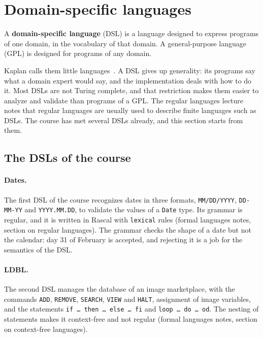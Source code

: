 \section{Domain-specific languages}
\label{sec:dsl}

\begin{definition}
A \textbf{domain-specific language} (DSL) is a language designed to express
programs of one domain, in the vocabulary of that domain. A general-purpose
language (GPL) is designed for programs of any domain.
\end{definition}

Kaplan calls them little languages~\cite{kaplan1994little}. A DSL gives up
generality: its programs say what a domain expert would say, and the
implementation deals with how to do it. Most DSLs are not Turing complete,
and that restriction makes them easier to analyze and validate than programs
of a GPL. The regular languages lecture notes that regular languages are
usually used to describe finite languages such as DSLs. The course has met
several DSLs already, and this section starts from them.

\subsection{The DSLs of the course}

\paragraph{Dates.} The first DSL of the course recognizes dates in three
formats, \texttt{MM/DD/YYYY}, \texttt{DD-MM-YY} and \texttt{YYYY.MM.DD}, to
validate the values of a \texttt{Date} type. Its grammar is regular, and it is
written in Rascal with \texttt{lexical} rules (formal languages notes, section
on regular languages). The grammar checks the shape of a date but not the
calendar: day 31 of February is accepted, and rejecting it is a job for the
semantics of the DSL.

\paragraph{LDBL.} The second DSL manages the database of an image
marketplace, with the commands \texttt{ADD}, \texttt{REMOVE}, \texttt{SEARCH},
\texttt{VIEW} and \texttt{HALT}, assignment of image variables, and the
statements \texttt{if \dots{} then \dots{} else \dots{} fi} and
\texttt{loop \dots{} do \dots{} od}. The nesting of statements makes it
context-free and not regular (formal languages notes, section on context-free
languages).

